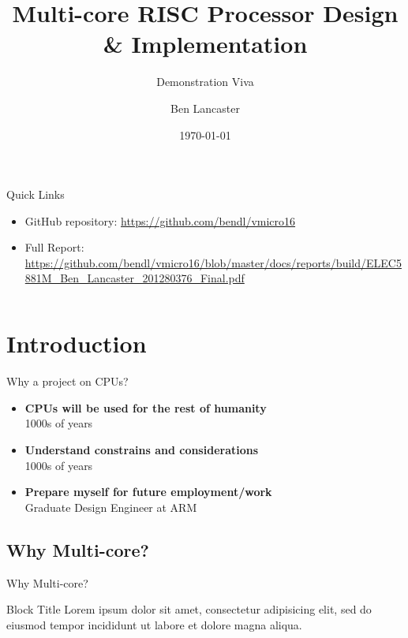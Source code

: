 \documentclass[aspectratio=169]{beamer}
\title
    [Main Project]
    {\textbf{Multi-core RISC Processor Design \& Implementation}}
\subtitle{Demonstration Viva}
\author
    [B. Lancaster]
    {Ben Lancaster}
\institute
    [\hypersetup{urlcolor=jdgrey}%
     \href{https://bendl.me/}{https://bendl.me}
    ]
    {201280376\\
    ELEC5881M - Main Project}
\date
    [12/2016]
    {\today}
\begin{document}
\begin{frame}[plain]
\titlepage
\end{frame}

\begin{frame}{Quick Links}
\begin{itemize}
    \item GitHub repository: \url{https://github.com/bendl/vmicro16}
    \item Full Report: \url{https://github.com/bendl/vmicro16/blob/master/docs/reports/build/ELEC5881M_Ben_Lancaster_201280376_Final.pdf}
\end{itemize}
\end{frame}

\begin{frame}
\vspace{-1cm}
\begin{columns}[t]
        \begin{column}{.5\textwidth}
            \tableofcontents[sections={1-3}]
        \end{column}
        \begin{column}{.5\textwidth}
            \tableofcontents[sections={4-5}]
        \end{column}
    \end{columns}
\end{frame}

\section{Introduction}
\frame{\tableofcontents[currentsection, subsectionstyle=show/show/hide]}

\begin{frame}{Why a project on CPUs?}
\begin{itemize}\setlength\itemsep{1em}
    \item{\textbf{CPUs will be used for the rest of humanity}\\
    1000s of years}
    \item{\textbf{Understand constrains and considerations}\\
    1000s of years}
    \item{\textbf{Prepare myself for future employment/work}\\
    Graduate Design Engineer at ARM}
\end{itemize}
\end{frame}

\subsection{Why Multi-core?}
\begin{frame}{Why Multi-core?}
\begin{alertblock}{Block Title}
Lorem ipsum dolor sit amet, consectetur adipisicing elit, 
sed do eiusmod tempor incididunt ut labore et 
dolore magna aliqua.
\end{alertblock}
\end{frame}
\end{document}
